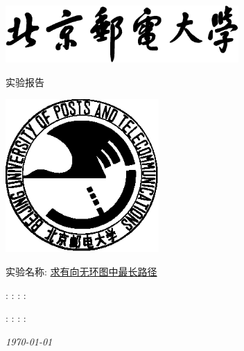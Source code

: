 \begin{titlepage}
    \center
    \includegraphics[width=3.5in]{images/buptname.eps}

    \begin{spacing}{5}
        {\bigsize 实验报告}
    \end{spacing}

    \includegraphics[width=2.3in]{images/buptseal.eps}

    \begin{spacing}{1}
        \vspace{2.5cm}
        \Large{实验名称:} \underline{求有向无环图中最长路径}
        \vspace{3cm}
    \end{spacing}

    \begin{minipage}{\linewidth}
         : \underline{}
         : \underline{}
         : \underline{}
         : \underline{}
    \end{minipage}

    \begin{minipage}{\linewidth}
         : \underline{}
         : \underline{}
         : \underline{}
         : \underline{}
    \end{minipage}

    {\small\em \today }
\end{titlepage}

